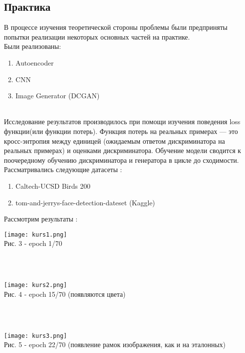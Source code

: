 \documentclass{article}
\begin{document}
    \newpage
    \begin{center} 
    \section{Практика}
    \end{center}
    \large
    В процессе изучения теоретической стороны проблемы были предприняты попытки реализации некоторых основных частей на практике.\\
    Были реализованы:
    \begin{enumerate}
        \item Autoencoder
        \item CNN
        \item Image Generator (DCGAN)
    \end{enumerate}
    \\
    Исследование результатов производилось при помощи изучения поведения loss функции(или функции потерь).
    Функция потерь на реальных примерах — это кросс-энтропия между единицей (ожидаемым ответом дискриминатора на реальных примерах) и оценками дискриминатора.
    Обучение модели сводится к поочередному обучению дискриминатора и генератора в цикле до сходимости.
    Рассматривались следующие датасеты :
    \begin{enumerate}
        \item Caltech-UCSD Birds 200
        \item tom-and-jerrys-face-detection-dateset (Kaggle)
    \end{enumerate}
    Рассмотрим результаты :

    \begin{center} 
    \texttt{[image: kurs1.png]}
    \\
    \caption{Рис. 3 - epoch 1/70}
    \\ \\
    \end{center} 

    \begin{center} 
    \texttt{[image: kurs2.png]}
    \\
    \caption{Рис. 4 - epoch 15/70 (появляются цвета)}
    \\ \\
    \end{center} 
    
    \begin{center} 
    \texttt{[image: kurs3.png]}
    \\
    \caption{Рис. 5 - epoch 22/70 (появление рамок изображения, как и на эталонных)}
    \\ \\
    \end{center} 
    
\end{document}
